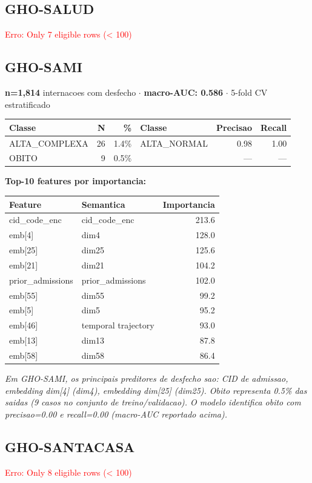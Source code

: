 \documentclass[11pt,a4paper]{article}
\begin{document}
\subsection{GHO-SALUD}
\textcolor{red}{Erro: Only 7 eligible rows (< 100)}

\subsection{GHO-SAMI}
\textbf{n=1,814} internacoes com desfecho $\cdot$ \textbf{macro-AUC: 0.586} $\cdot$ 5-fold CV estratificado

\begin{tabular}{lrr|lrr}
\toprule
Classe & N & \% & Classe & Precisao & Recall \\
\midrule
ALTA\_COMPLEXA & 26 & 1.4\% & ALTA\_NORMAL & 0.98 & 1.00 \\
OBITO & 9 & 0.5\% &  & --- & --- \\
\bottomrule
\end{tabular}

\vspace{4pt}\noindent\textbf{Top-10 features por importancia:}

\begin{tabular}{llr}
\toprule
Feature & Semantica & Importancia \\
\midrule
cid\_code\_enc & cid\_code\_enc & 213.6 \\
emb[4] & dim4 & 128.0 \\
emb[25] & dim25 & 125.6 \\
emb[21] & dim21 & 104.2 \\
prior\_admissions & prior\_admissions & 102.0 \\
emb[55] & dim55 & 99.2 \\
emb[5] & dim5 & 95.2 \\
emb[46] & temporal trajectory & 93.0 \\
emb[13] & dim13 & 87.8 \\
emb[58] & dim58 & 86.4 \\
\bottomrule
\end{tabular}

\vspace{4pt}\noindent\textit{Em GHO-SAMI, os principais preditores de desfecho sao: CID de admissao, embedding dim[4] (dim4), embedding dim[25] (dim25). Obito representa 0.5\% das saidas (9 casos no conjunto de treino/validacao). O modelo identifica obito com precisao=0.00 e recall=0.00 (macro-AUC reportado acima).}

\subsection{GHO-SANTACASA}
\textcolor{red}{Erro: Only 8 eligible rows (< 100)}
\end{document}
